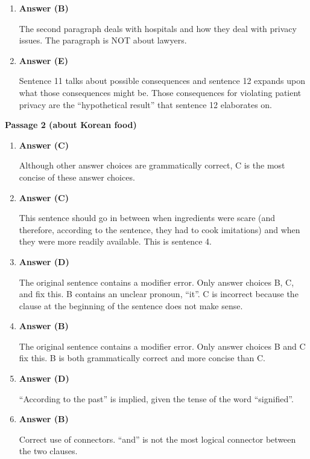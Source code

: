 \begin{enumerate}
\item \textbf{Answer (B)}

The second paragraph deals with hospitals and how they deal with privacy issues. The paragraph is NOT about lawyers.

\item \textbf{Answer (E)}

Sentence 11 talks about possible consequences and sentence 12 expands upon what those consequences might be. Those consequences for violating patient privacy are the ``hypothetical result'' that sentence 12 elaborates on.
\end{enumerate}

\textbf{Passage 2 (about Korean food)}

\begin{enumerate}
\item \textbf{Answer (C)}

Although other answer choices are grammatically correct, C is the most concise of these answer choices.  

\item \textbf{Answer (C)}

This sentence should go in between when ingredients were scare (and therefore, according to the sentence, they had to cook imitations) and when they were more readily available. This is sentence 4. 

\item \textbf{Answer (D)}

The original sentence contains a modifier error. Only answer choices B, C, and fix this. B contains an unclear pronoun, ``it''. C is incorrect because the clause at the beginning of the sentence does not make sense. 

\item \textbf{Answer (B)}

The original sentence contains a modifier error. Only answer choices B and C fix this. B is both grammatically correct and more concise than C. 

\item \textbf{Answer (D)}

``According to the past'' is implied, given the tense of the word ``signified''. 

\item \textbf{Answer (B)}

Correct use of connectors. ``and'' is not the most logical connector between the two clauses. 
\end{enumerate}